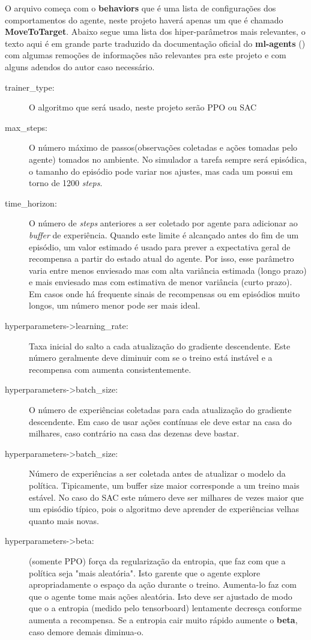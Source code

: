 O arquivo começa com o \textbf{behaviors} que é uma lista de configurações dos comportamentos do agente, neste projeto haverá apenas um que é chamado \textbf{MoveToTarget}. Abaixo segue uma lista dos hiper-parâmetros mais relevantes, o texto aqui é em grande parte traduzido da documentação oficial do \textbf{ml-agents} () com algumas remoções de informações não relevantes pra este projeto e com alguns adendos do autor caso necessário.

\begin{description}
   \item [trainer\_type:] O algoritmo que será usado, neste projeto serão PPO ou SAC
   \item [max\_steps:] O número máximo de passos(observações coletadas e ações tomadas pelo agente) tomados  no ambiente. No simulador a tarefa sempre será episódica, o tamanho do episódio pode variar nos ajustes, mas cada um possui em torno de 1200 \textit{steps}.
   \item [time\_horizon:] O número de \textit{steps} anteriores a ser coletado por agente para adicionar ao \textit{buffer} de experiência. Quando este limite é alcançado antes do fim de um episódio, um valor estimado é usado para prever a expectativa geral de recompensa a partir do estado atual do agente. Por isso, esse parâmetro varia entre menos enviesado mas com alta variância estimada (longo prazo) e mais enviesado mas com estimativa de menor variância (curto prazo). Em casos onde há frequente sinais de recompensas ou em episódios muito longos, um número menor pode ser mais ideal.
   \item [hyperparameters->learning\_rate:] Taxa inicial do salto a cada atualização do gradiente descendente. Este número geralmente deve diminuir com se o treino está instável e a recompensa com aumenta consistentemente.
   \item [hyperparameters->batch\_size:] O número de experiências coletadas para cada atualização do gradiente descendente. Em caso de usar ações contínuas ele deve estar na casa do milhares, caso contrário na casa das dezenas deve bastar.
   \item [hyperparameters->batch\_size:] Número de experiências a ser coletada antes de atualizar o modelo da política. Tipicamente, um buffer size maior corresponde a um treino mais estável. No caso do SAC este número deve ser milhares de vezes maior que um episódio típico, pois o algoritmo deve aprender de experiências velhas quanto mais novas.
   \item [hyperparameters->beta:] (somente PPO) força da regularização da entropia, que faz com que a política seja "mais aleatória". Isto garente que o agente explore apropriadamente o espaço da ação durante o treino. Aumenta-lo faz com que o agente tome mais ações aleatória. Isto deve ser ajustado de modo que o a entropia (medido pelo tensorboard) lentamente decresça conforme aumenta a recompensa. Se a entropia cair muito rápido aumente o \textbf{beta}, caso demore demais diminua-o.

\end{description}
